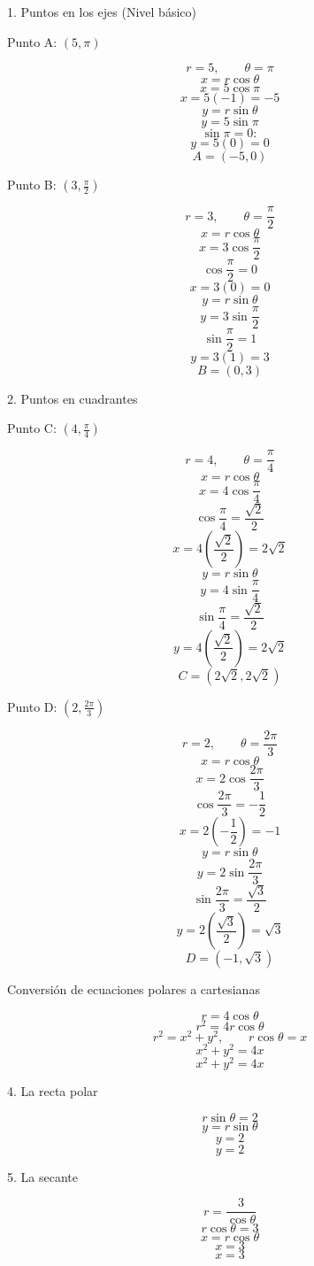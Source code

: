 \documentclass{article}
\begin{document}
\begin{justfy}
\small {1. Puntos en los ejes (Nivel básico)}

\vspace{0.1cm}
\small {Punto A: $(5,\pi)$}

\[r=5,\qquad \theta=\pi\]
\[x=r\cos\theta\]
\[x=5\cos\pi\]
\[x=5(-1)=-5\]
\[y=r\sin\theta\]
\[y=5\sin\pi\]
\[\sin\pi=0:\]
\[y=5(0)=0\]
\[\boxed{A=(-5,0)}\]

\vspace{0.1cm}
\small {Punto B: $\left(3,\frac{\pi}{2}\right)$}

\[r=3,\qquad \theta=\frac{\pi}{2}\]
\[x=r\cos\theta\]
\[x=3\cos\frac{\pi}{2}\]
\[\cos\frac{\pi}{2}=0\]
\[x=3(0)=0\]
\[y=r\sin\theta\]
\[y=3\sin\frac{\pi}{2}\]
\[\sin\frac{\pi}{2}=1\]
\[y=3(1)=3\]
\[\boxed{B=(0,3)}\]

\newpage

\small {2. Puntos en cuadrantes}

\vspace{0.1cm}
\small {Punto C: $\left(4,\frac{\pi}{4}\right)$}

\[r=4,\qquad \theta=\frac{\pi}{4}\]
\[x=r\cos\theta\]
\[x=4\cos\frac{\pi}{4}\]
\[\cos\frac{\pi}{4}=\frac{\sqrt{2}}{2}\]
\[x=4\left(\frac{\sqrt{2}}{2}\right)=2\sqrt{2}\]
\[y=r\sin\theta\]
\[y=4\sin\frac{\pi}{4}\]
\[\sin\frac{\pi}{4}=\frac{\sqrt{2}}{2}\]
\[y=4\left(\frac{\sqrt{2}}{2}\right)=2\sqrt{2}\]
\[\boxed{C=(2\sqrt{2},2\sqrt{2})}\]

\vspace{0.1cm}
\small {Punto D: $\left(2,\frac{2\pi}{3}\right)$}

\[r=2,\qquad \theta=\frac{2\pi}{3}\]
\[x=r\cos\theta\]
\[x=2\cos\frac{2\pi}{3}\]
\[\cos\frac{2\pi}{3}=-\frac{1}{2}\]
\[x=2\left(-\frac{1}{2}\right)=-1\]
\[y=r\sin\theta\]
\[y=2\sin\frac{2\pi}{3}\]
\[\sin\frac{2\pi}{3}=\frac{\sqrt{3}}{2}\]
\[y=2\left(\frac{\sqrt{3}}{2}\right)=\sqrt{3}\]
\[\boxed{D=(-1,\sqrt{3})}\]

\vspace{0.1cm}
\small \textbf{} {Conversión de ecuaciones polares a cartesianas}

\vspace{0.1cm}

\[r=4\cos\theta\]
\[r^2=4r\cos\theta\]
\[r^2=x^2+y^2,\qquad r\cos\theta=x\]
\[x^2+y^2=4x\]
\[\boxed{x^2+y^2=4x}\]

\vspace{0.1cm}
\small {4. La recta polar}

\[r\sin\theta=2\]
\[y=r\sin\theta\]
\[y=2\]
\[\boxed{y=2}\]

\vspace{0.1cm}
\small {5. La secante}

\[r=\frac{3}{\cos\theta}\]
\[r\cos\theta=3\]
\[x=r\cos\theta\]
\[x=3\]
\[\boxed{x=3}\]

\end{justfy}
\end{document}

